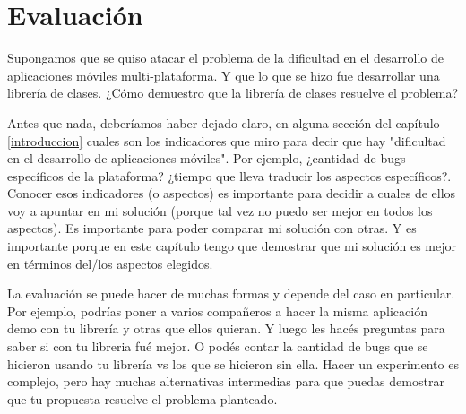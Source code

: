 \chapter{Evaluación}

Supongamos que se quiso atacar el problema de la dificultad en el desarrollo de aplicaciones móviles multi-plataforma. Y que lo que se hizo fue desarrollar una librería de clases. ¿Cómo demuestro que la librería de clases resuelve el problema?

Antes que nada, deberíamos haber dejado claro, en alguna sección del capítulo \ref{introduccion} cuales son los indicadores que miro para decir que hay "dificultad en el desarrollo de aplicaciones móviles". Por ejemplo, ¿cantidad de bugs específicos de la plataforma? ¿tiempo que lleva traducir los aspectos específicos?. Conocer esos indicadores (o aspectos) es importante para decidir a cuales de ellos voy a apuntar en mi solución (porque tal vez no puedo ser mejor en todos los aspectos). Es importante para poder comparar mi solución con otras. Y es importante porque en este capítulo tengo que demostrar que mi solución es mejor en términos del/los aspectos elegidos. 

La evaluación se puede hacer de muchas formas y depende del caso en particular. Por ejemplo, podrías poner a varios compañeros a hacer la misma aplicación demo con tu librería y otras que ellos quieran. Y luego les hacés preguntas para saber si con tu libreria fué mejor. O podés contar la cantidad de bugs que se hicieron usando tu librería vs los que se hicieron sin ella. Hacer un experimento es complejo, pero hay muchas alternativas intermedias para que puedas demostrar que tu propuesta resuelve el problema planteado.






